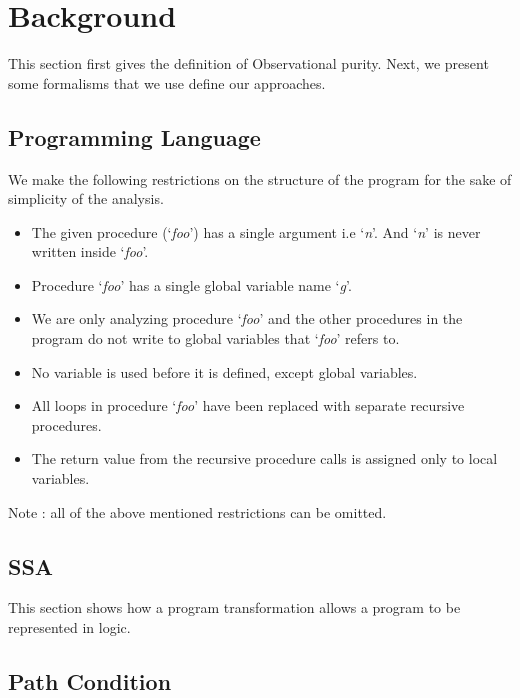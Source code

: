 \documentclass{llncs}
\newcommand{\foo}{\textit{foo}}
\newcommand{\pathCondition}{\mathit{T_{\foo}}}
\newcommand{\n}{\textit{n}}
\newcommand{\g}{\textit{g}}
\begin{document}
\section{Background} \label{sec:background}
This section first gives the definition of Observational purity. Next,
we present some formalisms that we use define our approaches.

\subsection{Programming Language}
We make the following restrictions on the structure of the program for
the sake of simplicity of the analysis.

\begin{itemize}
\item The given procedure (`\foo') has a single argument i.e `\n'. And
  `\n' is never written inside `\foo'.
\item Procedure `\foo' has a single global variable name `\g'.
\item We are only analyzing procedure `\foo' and the other procedures
  in the program do not write to global variables that `\foo' refers
  to.
\item No variable is used before it is defined, except global
  variables.
\item All loops in procedure `\foo' have been replaced with separate
  recursive procedures.
\item The return value from the recursive procedure calls is assigned
  only to local variables.
\end{itemize}

Note : all of the above mentioned restrictions can be omitted.
\subsection{SSA}
This section shows how a program transformation allows a program to be
represented in logic.

\subsection{Path Condition}
\end{document}
